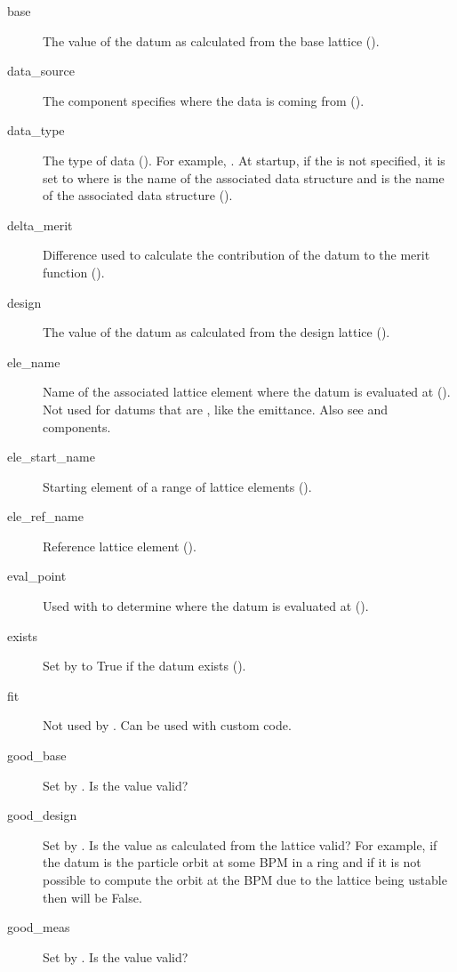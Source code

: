 \begin{description}
  \item[base] \Newline
The value of the datum as calculated from the base lattice ().
  \item[data_source] \Newline
The  component specifies where the data is coming from
().
  \item[data_type] \Newline
The type of data (). For example, . At startup, if the
 is not specified, it is set to  where
 is the name of the associated  data structure and  is 
the name of the associated  data structure ().
  \item[delta_merit] \Newline
Difference used to calculate the contribution of the datum to the merit function ().
  \item[design] \Newline
The value of the datum as calculated from the design lattice ().
  \item[ele_name] \Newline
Name of the associated lattice element where the datum is evaluated at (). Not
used for datums that are , like the emittance. Also see  and 
components.
  \item[ele_start_name] \Newline
Starting element of a range of lattice elements ().
  \item[ele_ref_name] \Newline
Reference lattice element ().
  \item[eval_point] \Newline
Used with  to determine where the datum is evaluated at ().
  \item[exists] \Newline
Set by \tao to True if the datum exists (). 
  \item[fit] \Newline
Not used by \tao. Can be used with custom code.
  \item[good_base] \Newline
Set by \tao. Is the  value valid?
  \item[good_design] \Newline
Set by \tao. Is the value as calculated from the  lattice valid? For example, if the
datum is the particle orbit at some BPM in a ring and if it is not possible to compute the orbit at
the BPM due to the lattice being ustable then  will be False.
  \item[good_meas] \Newline
Set by \tao. Is the  value valid?

\end{description}
